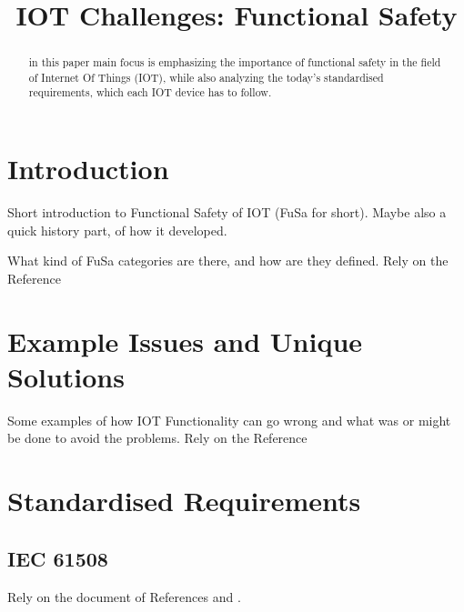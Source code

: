 \documentclass[conference]{IEEEtran}
\begin{document}
\title{IOT Challenges: Functional Safety}

\author{
}

\maketitle

\begin{abstract}
in this paper main focus is emphasizing the importance of functional safety in the field of Internet Of Things (IOT), while also analyzing the today's standardised requirements, which each IOT device has to follow.
\end{abstract}

\thispagestyle{firstpagefooter}

\section{Introduction}

Short introduction to Functional Safety of IOT (FuSa for short). Maybe also a quick history part, of how it developed.

What kind of FuSa categories are there, and how are they defined. Rely on the Reference \cite{robinson_living_2019}

\section{Example Issues and Unique Solutions}

Some examples of how IOT Functionality can go wrong and what was or might be done to avoid the problems. Rely on the Reference \cite{robinson_living_2019}

\section{Standardised Requirements}

\subsection{IEC 61508}

Rely on the document of References \cite{bell_introduction_nodate} and \cite{meany_functional_2017}.
\end{document}
